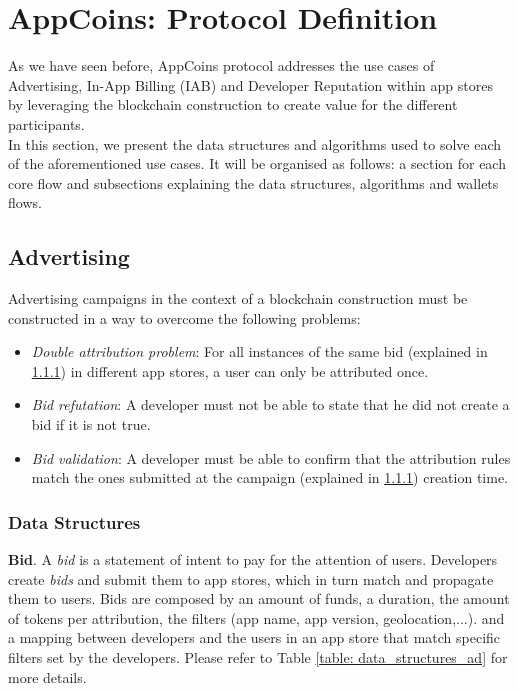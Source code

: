 \section{AppCoins: Protocol Definition}
\label{sec:protocol}

As we have seen before, AppCoins protocol addresses the use cases of Advertising, In-App Billing (IAB) and Developer Reputation within app stores by leveraging the blockchain construction to create value for the different participants.\\

In this section, we present the data structures and algorithms used to solve each of the aforementioned use cases. It will be organised as follows: a section for each core flow and subsections explaining the data structures, algorithms and wallets flows.

\subsection{Advertising}

Advertising campaigns in the context of a blockchain construction must be constructed in a way to overcome the following problems:
\begin{itemize}
\item \textit{Double attribution problem}: For all instances of the same bid (explained in \ref{sssec:ads_ds}) in different app stores, a user can only be attributed once.
\item \textit{Bid refutation}: A developer must not be able to state that he did not create a bid if it is not true.
\item \textit{Bid validation}: A developer must be able to confirm that the attribution rules match the ones submitted at the campaign (explained in \ref{sssec:ads_ds}) creation time.
\end{itemize}

\subsubsection{Data Structures}
\label{sssec:ads_ds}

\noindent \textbf{Bid}. A \textit{bid} is a statement of intent to pay for the attention of users. Developers create \textit{bids} and submit them to app stores, which in turn match and propagate them to users. Bids are composed by an amount of funds, a duration, the amount of tokens per attribution, the filters (app name, app version, geolocation,...). and a mapping between developers and the users in an app store that match specific filters set by the developers. Please refer to Table \ref{table: data_structures_ad} for more details. \\


